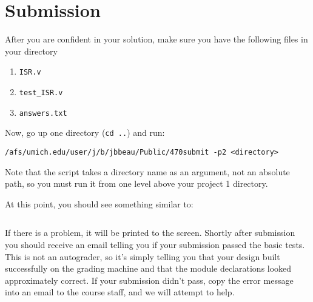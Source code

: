 \documentclass{article}
\begin{document}
\section{Submission}
After you are confident in your solution, make sure you have the following files
in your directory
\begin{enumerate}
	\item \texttt{ISR.v}
	\item \texttt{test\_ISR.v}
	\item \texttt{answers.txt}
\end{enumerate}
Now, go up one directory (\texttt{cd ..}) and run:

\texttt{/afs/umich.edu/user/j/b/jbbeau/Public/470submit -p2 <directory>}

\noindent
Note that the script takes a directory name as an argument, not an absolute
path, so you must run it from one level above your project 1 directory. 

At this point, you should see something similar to: 
\inputminted[frame=lines,obeytabs,tabsize=4]{bash}{submission.txt}
\noindent
If there is a problem, it will be printed to the screen. Shortly after
submission you should receive an email telling you if your submission passed the
basic tests. This is not an autograder, so it's simply telling you that your
design built successfully on the grading machine and that the module
declarations looked approximately correct. If your submission didn't pass, copy
the error message into an email to the course staff, and we will attempt to
help.
\end{document}
